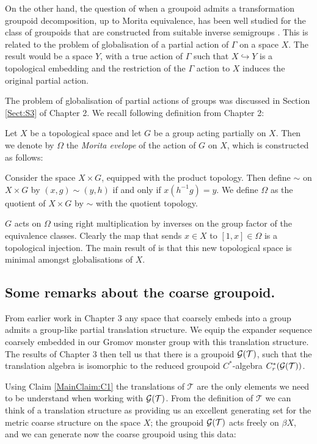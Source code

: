 \begin{example}
On the other hand, the question of when a groupoid admits a transformation groupoid decomposition, up to Morita equivalence, has been well studied for the class of groupoids that are constructed from suitable inverse semigroups \cite{MR1900993,Milan-Steinberg}. This is related to the problem of globalisation of a partial action of $\Gamma$ on a space $X$. The result would be a space $Y$, with a true action of $\Gamma$ such that $X \hookrightarrow Y$ is a topological embedding and the restriction of the $\Gamma$ action to $X$ induces the original partial action.

The problem of globalisation of partial actions of groups was discussed in Section \ref{Sect:S3} of Chapter 2. We recall following definition from Chapter 2:
\begin{definition}
Let $X$ be a topological space and let $G$ be a group acting partially on $X$. Then we denote by $\Omega$ the \textit{Morita evelope} of the action of $G$ on $X$, which is constructed as follows:

Consider the space $X\times G$, equipped with the product topology. Then define $\sim$ on $X\times G$ by $(x,g)\sim (y,h)$ if and only if $x(h^{-1}g)=y$. We define $\Omega$ as the quotient of $X\times G$ by $\sim$ with the quotient topology. 

$G$ acts on $\Omega$ using right multiplication by inverses on the group factor of the equivalence classes. Clearly the map that sends $x \in X$ to $[1,x] \in \Omega$ is a topological injection. The main result of \cite{MR2041539} is that this new topological space is minimal amongst globalisations of $X$.
\end{definition}

\subsection{Some remarks about the coarse groupoid.}

From earlier work in Chapter 3 any space that coarsely embeds into a group admits a group-like partial translation structure. We equip the expander sequence coarsely embedded in our Gromov monster group with this translation structure. The results of Chapter 3 then tell us that there is a groupoid $\mathcal{G}(\mathcal{T})$, such that the translation algebra is isomorphic to the reduced groupoid  $C^{*}$-algebra $C^{*}_{r}(\mathcal{G}(\mathcal{T}))$. 

Using Claim \ref{MainClaim:C1} the translations of $\mathcal{T}$ are the only elements we need to be understand when working with $\mathcal{G}(\mathcal{T})$. From the definition of $\mathcal{T}$ we can think of a translation structure as providing us an excellent generating set for the metric coarse structure on the space $X$; the groupoid $\mathcal{G}(\mathcal{T})$ acts freely on $\beta X$, and we can generate now the coarse groupoid using this data:


\end{example}
